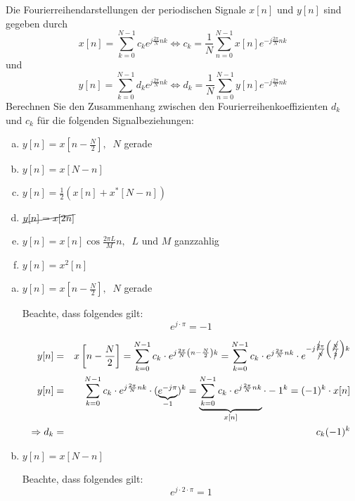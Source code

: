 \begin{uebsp}
\begin{Exercise}
    Die Fourierreihendarstellungen der periodischen Signale $x[n]$ und $y[n]$ sind gegeben durch
    \[x[n]=\sum_{k=0}^{N-1}c_ke^{j\frac{2\pi}{N}nk}\Leftrightarrow c_k=\frac{1}{N}\sum_{n=0}^{N-1}x[n]e^{-j\frac{2\pi}{N}nk}\]
    und 
    \[y[n]=\sum_{k=0}^{N-1}d_ke^{j\frac{2\pi}{N}nk}\Leftrightarrow d_k=\frac{1}{N}\sum_{n=0}^{N-1}y[n]e^{-j\frac{2\pi}{N}nk}\]
    Berechnen Sie den Zusammenhang zwischen den Fourierreihenkoeffizienten $d_k$ und $c_k$ für die folgenden Signalbeziehungen:
    \begin{enumerate}[a)]
        \item $y[n]=x\left[n-\frac{N}{2}\right],\;\;N$ gerade
        \item $y[n]=x\left[N-n\right]$
        \item $y[n]=\frac{1}{2}\left(x[n]+x^*\left[N-n\right]\right)$
        \item $\cancel{y[n]=x[2n]}$
        \item $y[n]=x[n]\cos\frac{2\pi L}{M}n,\;\;L$ und $M$ ganzzahlig
        \item $y[n]=x^2[n]$
    \end{enumerate}
\end{Exercise}
\begin{Answer}
     \begin{enumerate}[a)]
        \item $y[n]=x\left[n-\frac{N}{2}\right],\;\;N$ gerade
            \begin{uebsp_theory}
            Beachte, dass folgendes gilt:
            \[e^{j\cdot\pi}=-1\]
            \end{uebsp_theory}

        \begin{eqnarray*}
            y[n]&=&x\left[n-\frac{N}{2}\right]=\sum_{k=0}^{N-1}c_k\cdot e^{j\frac{2\pi}{N}\left(n-\frac{N}{2}\right)k}=
            \sum_{k=0}^{N-1}c_k\cdot e^{j\frac{2\pi}{N}nk}\cdot e^{-j\frac{\cancel 2\pi}{\cancel N}\left(\frac{\cancel N}{\cancel 2}\right)k}\\
        y[n]&=&\sum_{k=0}^{N-1}c_k\cdot e^{j\frac{2\pi}{N}nk}\cdot (\underbrace{e^{-j\pi}}_{-1})^k=
            \underbrace{\sum_{k=0}^{N-1}c_k\cdot e^{j\frac{2\pi}{N}nk}}_{x[n]}\cdot -1^k=(-1)^k\cdot x[n]\\
        \Rightarrow d_k&=&c_k(-1)^k
        \end{eqnarray*}
        \item $y[n]=x\left[N-n\right]$
            \begin{uebsp_theory}
            Beachte, dass folgendes gilt:
            \[e^{j\cdot 2\cdot\pi}=1\]
            \end{uebsp_theory}


\end{enumerate}
\end{Answer}
\end{uebsp}
